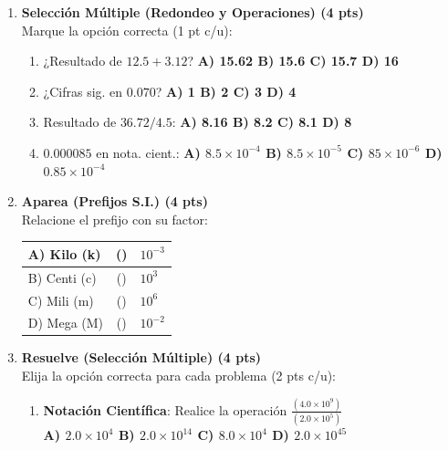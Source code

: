 \documentclass[a4paper,12pt]{article}
\begin{document}
\begin{enumerate}[label=\textbf{Item \arabic*:}, leftmargin=*]
    \item \textbf{Selección Múltiple (Redondeo y Operaciones) (4 pts)} \\
    Marque la opción correcta (1 pt c/u):
    \begin{enumerate}[label=\roman*)]
        \item ¿Resultado de $12.5 + 3.12$? \textbf{A) 15.62 \quad B) 15.6 \quad C) 15.7 \quad D) 16}
        \item ¿Cifras sig. en $0.070$? \textbf{A) 1 \quad B) 2 \quad C) 3 \quad D) 4}
        \item Resultado de $36.72 / 4.5$: \textbf{A) 8.16 \quad B) 8.2 \quad C) 8.1 \quad D) 8}
        \item $0.000085$ en nota. cient.: \textbf{A) $8.5\times 10^{-4}$ \quad B) $8.5\times 10^{-5}$ \quad C) $85\times 10^{-6}$ \quad D) $0.85\times 10^{-4}$}
    \end{enumerate}

    \item \textbf{Aparea (Prefijos S.I.) (4 pts)} \\
    Relacione el prefijo con su factor:
    \begin{center}
    \begin{tabular}{|l|c|l|}
        \hline
        A) Kilo (k) & (\hspace{0.5cm}) & $10^{-3}$ \\ \hline
        B) Centi (c) & (\hspace{0.5cm}) & $10^{3}$ \\ \hline
        C) Mili (m) & (\hspace{0.5cm}) & $10^{6}$ \\ \hline
        D) Mega (M) & (\hspace{0.5cm}) & $10^{-2}$ \\ \hline
    \end{tabular}
    \end{center}

    \item \textbf{Resuelve (Selección Múltiple) (4 pts)} \\
    Elija la opción correcta para cada problema (2 pts c/u):
    \begin{enumerate}[label=\Alph*)]
        \item \textbf{Notación Científica}: Realice la operación $\frac{(4.0 \times 10^9)}{(2.0 \times 10^5)}$ \\
        \textbf{A) $2.0 \times 10^4$ \quad B) $2.0 \times 10^{14}$ \quad C) $8.0 \times 10^4$ \quad D) $2.0 \times 10^{45}$}
        

\end{enumerate}
\end{enumerate}
\end{document}
